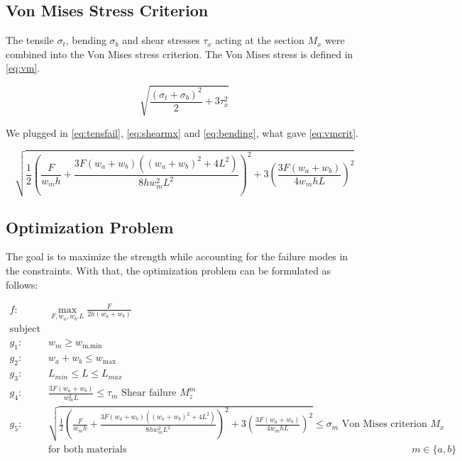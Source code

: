 \subsection{Von Mises Stress Criterion}
The tensile $\sigma_t$, bending $\sigma_b$ and shear stresses $\tau_x$ acting at the section $M_x$ were combined into the Von Mises stress criterion. The Von Mises stress is defined in \autoref{eq:vm}.

\begin{equation}
	\label{eq:vm}
	\sqrt{\frac{\left( \sigma_t + \sigma_b \right)^2}{2} + 3\tau_x ^2}
\end{equation}

We plugged in \autoref{eq:tensfail}, \ref{eq:shearmx} and \ref{eq:bending}, what gave \ref{eq:vmcrit}.

\begin{equation}
	\label{eq:vmcrit}
	\sqrt{\frac{1}{2} \left( \frac{F}{w_m  h} + 	\frac{ 3 F \left(w_a + w_b \right) \left(\left(w_a + w_b \right) ^2 + 4L^2 \right)  }{ 8h w_m^2 L^2 }   \right)^2+ 3\left(	\frac{ 3 F \left(w_a + w_b \right) }{ 4  w_m h L }  \right) ^2}
\end{equation}


\subsection{Optimization Problem}
The goal is to maximize the strength while accounting for the failure modes in the constraints.
With that, the optimization problem can be formulated as follows:

\begin{align*}
	f: & \max_{F, {w_a}, {w_b}. L} \frac{F}{2h \left(w_a + w_b\right)} \nonumber \\
	\text{subject to:} & \nonumber \\
	g_1: & w_m \ge w_\text{m,min} \\
	g_2: & w_a + w_b \le w_\text{max} \\
	g_3: & L_{min} \le L \le L_{max} \\
	g_4: & \frac{ 3 F \left(w_a + w_b \right) }{ w_m ^2 L} \le \tau_m						\text{ Shear failure } M_z^m \\
	g_5:& \sqrt{\frac{1}{2} \left( \frac{F}{w_m  h} + 	\frac{ 3 F \left(w_a + w_b \right) \left(\left(w_a + w_b \right) ^2 + 4L^2 \right)  }{ 8h w_m^2 L^2 }   \right)^2+ 3\left(	\frac{ 3 F \left(w_a + w_b \right) }{ 4  w_m h L}  \right) ^2}		\le 	\sigma_m	\text{ Von Mises criterion } M_x \\
	& \text{for both materials } && m \in \{a, b\} \nonumber 
\end{align*}


